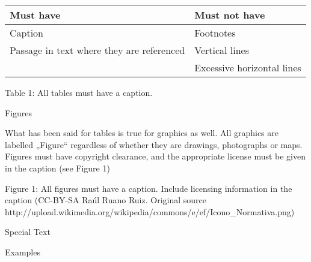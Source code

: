 \begin{center}
\tablehead{}
\begin{supertabular}{m{1.5844599in}m{1.6045599in}}
\fontsize{12pt}{14.4pt}\selectfont Must have &
\fontsize{12pt}{14.4pt}\selectfont Must not have\\\hline
\fontsize{12pt}{14.4pt}\selectfont Caption &
\fontsize{12pt}{14.4pt}\selectfont Footnotes\\
\fontsize{12pt}{14.4pt}\selectfont Passage in text where they are referenced &
\fontsize{12pt}{14.4pt}\selectfont Vertical lines\\
 &
\fontsize{12pt}{14.4pt}\selectfont Excessive horizontal lines\\
\end{supertabular}
\end{center}
\begin{styleStandard}
Table 1: All tables must have a caption. 
\end{styleStandard}

\begin{styleHeadingii}
Figures
\end{styleHeadingii}

\begin{styleStandard}
What has been said for tables is true for graphics as well. All graphics are labelled „Figure“ regardless of whether they are drawings, photographs or maps. Figures must have copyright clearance, and the appropriate license must be given in the caption (see Figure 1)
\end{styleStandard}

\begin{styleStandard}

\end{styleStandard}

\begin{center}
\begin{minipage}{3.389in}
\begin{styleIllustration}
Figure 1: All figures must have a caption. Include licensing information in the caption (CC-BY-SA Raúl Ruano Ruiz. Original source http://upload.wikimedia.org/wikipedia/commons/e/ef/Icono\_Normativa.png)
\end{styleIllustration}
\end{minipage}
\end{center}
\begin{styleHeadingi}
Special Text
\end{styleHeadingi}

\begin{styleHeadingii}
Examples 
\end{styleHeadingii}

